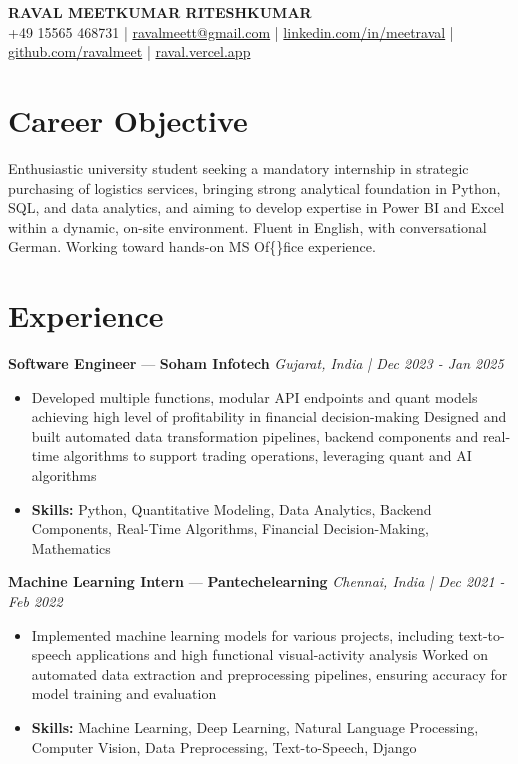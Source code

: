 \documentclass[a4paper,10pt]{article}
\begin{document}
\begin{center}
  {\Large\bfseries RAVAL MEETKUMAR RITESHKUMAR}\\[2pt]
  {\small +49 15565 468731 \;|\; \href{mailto:ravalmeett@gmail.com}{ravalmeett@gmail.com} \;|\; \href{https://www.linkedin.com/in/meetraval/}{linkedin.com/in/meetraval} \;|\; \href{https://github.com/ravalmeet}{github.com/ravalmeet} \;|\; \href{https://raval.vercel.app/}{raval.vercel.app}}
\end{center}
\vspace{-3pt}

\section*{Career Objective}
Enthusiastic university student seeking a mandatory internship in strategic purchasing of logistics services, bringing strong analytical foundation in Python, SQL, and data analytics, and aiming to develop expertise in Power BI and Excel within a dynamic, on-site environment. Fluent in English, with conversational German. Working toward hands-on MS Of\{\}fice experience.\par

\section*{Experience}
\textbf{Software Engineer} — \textbf{Soham Infotech} \hfill \textit{Gujarat, India \;|\; Dec 2023 - Jan 2025}\par
\vspace{1pt}
\begin{itemize}
  \item Developed multiple functions, modular API endpoints and quant models achieving high level of profitability in financial decision-making Designed and built automated data transformation pipelines, backend components and real-time algorithms to support trading operations, leveraging quant and AI algorithms
  \item \textbf{Skills:} Python, Quantitative Modeling, Data Analytics, Backend Components, Real-Time Algorithms, Financial Decision-Making, Mathematics
\end{itemize}
\vspace{3pt}
\textbf{Machine Learning Intern} — \textbf{Pantechelearning} \hfill \textit{Chennai, India \;|\; Dec 2021 - Feb 2022}\par
\vspace{1pt}
\begin{itemize}
  \item Implemented machine learning models for various projects, including text-to-speech applications and high functional visual-activity analysis Worked on automated data extraction and preprocessing pipelines, ensuring accuracy for model training and evaluation
  \item \textbf{Skills:} Machine Learning, Deep Learning, Natural Language Processing, Computer Vision, Data Preprocessing, Text-to-Speech, Django
\end{itemize}
\end{document}
